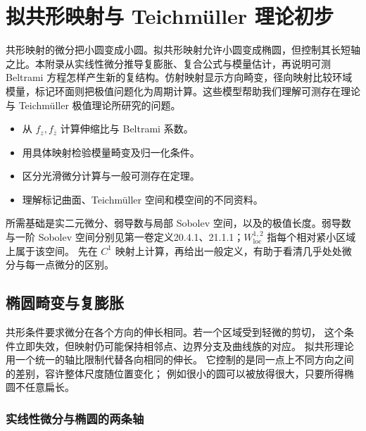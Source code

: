 \chapter{拟共形映射与 Teichmüller 理论初步}
\label{b3:app:B}
\begin{chapterabstract}
共形映射的微分把小圆变成小圆。拟共形映射允许小圆变成椭圆，但控制其长短轴之比。本附录从实线性微分推导复膨胀、复合公式与模量估计，再说明可测 Beltrami 方程怎样产生新的复结构。仿射映射显示方向畸变，径向映射比较环域模量，标记环面则把极值问题化为周期计算。这些模型帮助我们理解可测存在理论与 Teichmüller 极值理论所研究的问题。
\end{chapterabstract}
\begin{learninggoals}
\begin{itemize}
\item\label{b3:item:B-goal-1}从 \(f_z,f_{\bar z}\) 计算伸缩比与 Beltrami 系数。
\item\label{b3:item:B-goal-2}用具体映射检验模量畸变及归一化条件。
\item\label{b3:item:B-goal-3}区分光滑微分计算与一般可测存在定理。
\item\label{b3:item:B-goal-4}理解标记曲面、Teichmüller 空间和模空间的不同资料。
\end{itemize}
\end{learninggoals}

所需基础是实二元微分、弱导数与局部 Sobolev 空间，以及的极值长度。弱导数与一阶 Sobolev 空间分别见第一卷定义20.4.1、21.1.1；\(W^{1,2}_{\mathrm{loc}}\) 指每个相对紧小区域上属于该空间。
先在 \(C^1\) 映射上计算，再给出一般定义，有助于看清几乎处处微分与每一点微分的区别。

\section{椭圆畸变与复膨胀}
\label{b3:sec:B01}

共形条件要求微分在各个方向的伸长相同。若一个区域受到轻微的剪切，
这个条件立即失效，但映射仍可能保持相邻点、边界分支及曲线族的对应。
拟共形理论用一个统一的轴比限制代替各向相同的伸长。
它控制的是同一点上不同方向之间的差别，容许整体尺度随位置变化；
例如很小的圆可以被放得很大，只要所得椭圆不任意扁长。

\subsection{实线性微分与椭圆的两条轴}
\label{b3:subsec:B0101}

